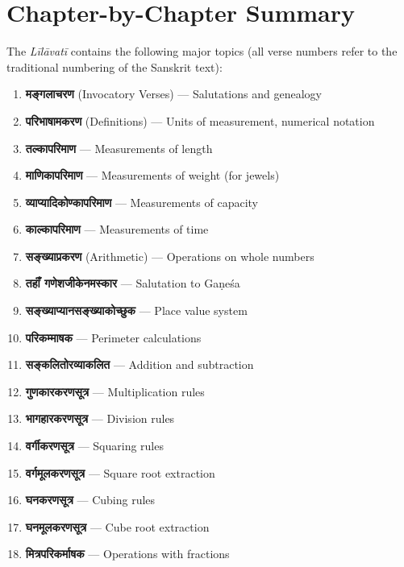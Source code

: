 \documentclass[11pt,a4paper]{book}
\begin{document}
\tableofcontents

\mainmatter
\pagestyle{fancy}

\chapter*{Chapter-by-Chapter Summary}

The \textit{Līlāvatī} contains the following major topics (all verse numbers refer to the traditional numbering of the Sanskrit text):

\begin{enumerate}[label=\arabic*., leftmargin=*]
\item \textbf{मङ्गलाचरण} (Invocatory Verses) — Salutations and genealogy
\item \textbf{परिभाषामकरण} (Definitions) — Units of measurement, numerical notation
\item \textbf{तल्कापरिमाण} — Measurements of length
\item \textbf{माणिकापरिमाण} — Measurements of weight (for jewels)
\item \textbf{व्याप्यादिकोण्कापरिमाण} — Measurements of capacity
\item \textbf{काल्कापरिमाण} — Measurements of time
\item \textbf{सङ्ख्याप्रकरण} (Arithmetic) — Operations on whole numbers
\item \textbf{तहाँं गणेशजीकेनमस्कार} — Salutation to Gaṇeśa
\item \textbf{सङ्ख्याप्यानसङ्ख्याकोच्छुक} — Place value system
\item \textbf{परिकम्माषक} — Perimeter calculations
\item \textbf{सङ्कलितोरव्याकलित} — Addition and subtraction
\item \textbf{गुणकारकरणसूत्र} — Multiplication rules
\item \textbf{भागहारकरणसूत्र} — Division rules
\item \textbf{वर्गीकरणसूत्र} — Squaring rules
\item \textbf{वर्गमूलकरणसूत्र} — Square root extraction
\item \textbf{घनकरणसूत्र} — Cubing rules
\item \textbf{घनमूलकरणसूत्र} — Cube root extraction
\item \textbf{मित्रपरिकर्माषक} — Operations with fractions

\end{enumerate}
\end{document}
